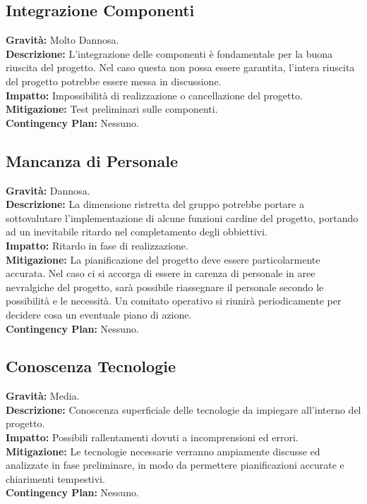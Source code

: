 \documentclass[a4paper,12pt]{article}
\begin{document}
\subsection{Integrazione Componenti}
\textbf{Gravità:} Molto Dannosa.\\
\textbf{Descrizione:} L'integrazione delle componenti è fondamentale per la buona riuscita del progetto. Nel caso questa non possa essere garantita, l'intera riuscita del progetto potrebbe essere messa in discussione.\\
\textbf{Impatto:} Impossibilità di realizzazione o cancellazione del progetto.\\
\textbf{Mitigazione:} Test preliminari sulle componenti.\\
\textbf{Contingency Plan:} Nessuno.

\subsection{Mancanza di Personale}
\textbf{Gravità:} Dannosa.\\
\textbf{Descrizione:} La dimensione ristretta del gruppo potrebbe portare a sottovalutare l'implementazione di alcune funzioni cardine del progetto, portando ad un inevitabile ritardo nel completamento degli obbiettivi.\\
\textbf{Impatto:} Ritardo in fase di realizzazione.\\
\textbf{Mitigazione:} La pianificazione del progetto deve essere particolarmente accurata. Nel caso ci si accorga di essere in carenza di personale in aree nevralgiche del progetto, sarà possibile riassegnare il personale secondo le possibilità e le necessità. Un comitato operativo si riunirà periodicamente per decidere cosa un eventuale piano di azione.\\
\textbf{Contingency Plan:} Nessuno.

\subsection{Conoscenza Tecnologie}
\textbf{Gravità:} Media.\\
\textbf{Descrizione:} Conoscenza superficiale delle tecnologie da impiegare all'interno del progetto.\\
\textbf{Impatto:} Possibili rallentamenti dovuti a incomprensioni ed errori.\\
\textbf{Mitigazione:} Le tecnologie necessarie verranno ampiamente discusse ed analizzate in fase preliminare, in modo da permettere pianificazioni accurate e chiarimenti tempestivi.\\
\textbf{Contingency Plan:} Nessuno.
\end{document}
